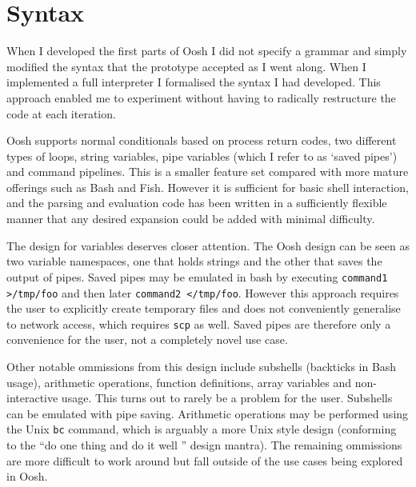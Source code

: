 \documentclass[12pt,twoside,notitlepage]{report}
\begin{document}
\section{Syntax}
When I developed the first parts of Oosh I did not specify a grammar and simply
modified the syntax that the prototype accepted as I went along. When I
implemented a full interpreter I formalised the syntax I had developed. This
approach enabled me to experiment without having to radically restructure the
code at each iteration.

Oosh supports normal conditionals based on process return codes, two
different types of loops, string variables, pipe variables (which I
refer to as `saved pipes') and command pipelines. This is a smaller
feature set compared with more mature offerings such as Bash and
Fish. However it is sufficient for basic shell interaction, and the
parsing and evaluation code has been written in a sufficiently
flexible manner that any desired expansion could be added with minimal
difficulty.

The design for variables deserves closer attention. The Oosh design
can be seen as two variable namespaces, one that holds strings and the
other that saves the output of pipes. Saved pipes may be emulated in
bash by executing {\tt command1 >/tmp/foo} and then later {\tt command2
  </tmp/foo}. However this approach requires the user to explicitly
create temporary files and does not conveniently generalise to network
access, which requires {\tt scp} as well. Saved pipes are therefore
only a convenience for the user, not a completely novel use case.

Other notable ommissions from this design include subshells (backticks
in Bash usage), arithmetic operations, function definitions, array
variables and non-interactive usage. This turns out to rarely be a
problem for the user. Subshells can be emulated with pipe
saving. Arithmetic operations may be performed using the Unix {\tt bc}
command, which is arguably a more Unix style design (conforming to the
``do one thing and do it well '' design mantra). The remaining
ommissions are more difficult to work around but fall outside of the
use cases being explored in Oosh.
\end{document}
